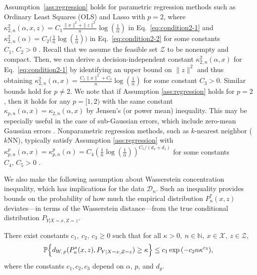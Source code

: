 \documentclass[onefignum,onetabnum]{siamart251216}
\begin{document}
Assumption~\ref{ass:regression} holds for parametric regression methods such as Ordinary Least Squares (OLS) and Lasso with $p=2$, where $\kappa_{2,n}^2(\alpha,x,z)= C_1\frac{\|x\|^2+\|z\|^2}{n} \log (\frac{1}{\alpha})$ in Eq.~\eqref{eq:condition2-1} and $\kappa_{2,n}^2(\alpha)=C_2\big(\frac{1}{n}\log(\frac{1}{\alpha})\big)$ in Eq.~\eqref{eq:condition2-2} for some constants $C_1,\, C_2>0$ \cite{hsu2012random,rigollet2023high,bunea2007sparsity}. 
Recall that we assume the feasible set $\mathcal{Z}$ to be nonempty and compact. Then, we can derive a decision-independent constant $\kappa_{2,n}^2(\alpha,x)$ for Eq.~\eqref{eq:condition2-1} by identifying an upper bound on $\|z\|^2$ and thus obtaining  $\kappa_{2,n}^2(\alpha,x)= \frac{C_1\|x\|^2+C_3}{n} \log (\frac{1}{\alpha})$ for some constant $C_3>0$. 
Similar bounds hold for $p \neq 2$.
We note that if Assumption \ref{ass:regression} holds for $p=2$, then it holds for any $p=[1,2)$ with the same constant $\kappa_{p,n}(\alpha,x)=\kappa_{2,n}(\alpha,x)$ by Jensen's (or power mean) inequality. This may be especially useful in the case of sub-Gaussian errors, which include zero-mean Gaussian errors \cite{kannan2020residuals}. 
Nonparametric regression methods, such as $k$-nearest neighbor ($k$NN),
typically satisfy Assumption \ref{ass:regression} with $\kappa_{p,n}^p(\alpha,x)=\kappa_{p,n}^p(\alpha) = C_4(\frac{1}{n}\log(\frac{1}{\alpha}))^{C_5/{(d_x + d_z)}}$ for some constants $C_4,\, C_5 >0$ \citep[][Lemma 10]{bertsimas2019predictions}.

We also make the following assumption about Wasserstein  concentration inequality, which has implications for the data $\mathcal{D}_n$. Such an inequality provides bounds on the probability of how much the empirical distribution $P_n^*(x,z)$ deviates---in terms of the Wasserstein distance---from the true conditional distribution $P_{Y|X=x,Z=z}$.

    \begin{assumption}\label{prop: concentration}
    There exist constants $c_1,\ c_2,\ c_3\ge 0$ such that for all $\kappa>0, \ n\in\mathbb{N},\ x\in \mathcal{X},\ z\in\mathcal{Z}$,
    \begin{align}\label{eq:concentration}
    \mathbb{P} \Bigl\{d_{W,\, p}(P_n^*(x,z),P_{Y|X=x,Z=z}) \geq \kappa \Bigr\} \leq  c_1\exp{(-c_2n\kappa^{c_3})}, 
    \end{align}
where the constants $c_1,c_2,c_3$ depend on $\alpha$, $p$, and $d_y$. 
\end{assumption}
\end{document}
